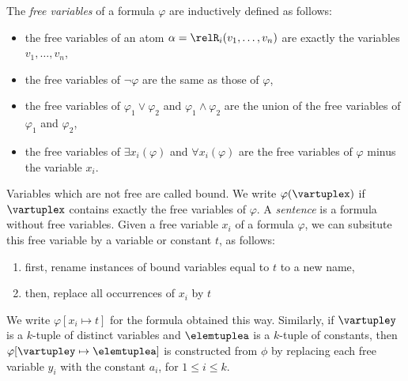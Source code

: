 \begin{samepage}%
\noindent%
The \emph{free variables} of a formula $\varphi$ are inductively defined as follows:
\begin{itemize}
  \item the free variables of an atom $\alpha = \relR_{i}(v_{1}, \ldots, v_{n})$ are exactly the variables $v_{1}, \ldots, v_{n}$,
  \item the free variables of $\neg \varphi$ are the same as those of $\varphi$,
  \item the free variables of $\varphi_{1} \lor \varphi_{2}$ and $\varphi_{1} \land \varphi_{2}$ are the union of the free variables of $\varphi_{1}$ and $\varphi_{2}$,
  \item the free variables of $\exists{x_{i}(\varphi)}$ and $\forall{x_{i}(\varphi)}$ are the free variables of $\varphi$ minus the variable $x_{i}$.
\end{itemize}
\end{samepage}
Variables which are not free are called bound.
We write $\varphi(\vartuplex)$ if $\vartuplex$ contains exactly the free variables of $\varphi$.
A \emph{sentence} is a formula without free variables.
Given a free variable $x_{i}$ of a formula $\varphi$, we can subsitute this free variable by a variable or constant $t$, as follows:
\begin{enumerate}
  \item first, rename instances of bound variables equal to $t$ to a new name,
  \item then, replace all occurrences of $x_{i}$ by $t$
\end{enumerate}
We write $\varphi[x_{i} \mapsto t]$ for the formula obtained this way.
Similarly, if $\vartupley$ is a $k$-tuple of distinct variables and $\elemtuplea$ is a $k$-tuple of constants, then $\varphi[\vartupley \mapsto \elemtuplea]$ is constructed from $\phi$ by replacing each free variable $y_{i}$ with the constant $a_{i}$, for $1 \le i \le k$.

